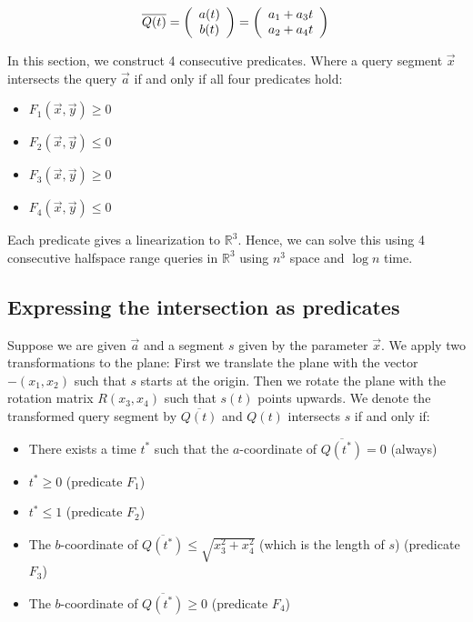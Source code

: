 \documentclass{article}
\begin{document}
\begin{equation}
        \overline{Q(t)} = \left( \begin{array}{c}
         a(t)  \\
         b(t) 
    \end{array}  \right) = \left( \begin{array}{c}
         a_1 +  a_3t  \\
         a_2 + a_4t 
    \end{array} \right)  \\
\end{equation}

In this section, we construct 4 consecutive predicates. Where a query segment $\vec{x}$ intersects the query $\vec{a}$ if and only if all four predicates hold:
\begin{itemize}
    \item $F_1(\vec{x}, \vec{y}) \ge 0$
    \item $F_2(\vec{x}, \vec{y}) \le 0$
    \item $F_3(\vec{x}, \vec{y}) \ge 0$
    \item $F_4(\vec{x}, \vec{y}) \le 0$
\end{itemize}

Each predicate gives a linearization to $\mathbb{R}^3$. Hence, we can solve this using 4 consecutive halfspace range queries in $\mathbb{R}^3$ using $n^3$ space and $\log n$ time.

\subsection{Expressing the intersection as predicates}

Suppose we are given $\vec{a}$ and a segment $s$ given by the parameter $\vec{x}$. We apply two transformations to the plane: First we translate the plane with the vector $-(x_1, x_2)$ such that $s$ starts at the origin. Then we rotate the plane with the rotation matrix $R(x_3, x_4)$ such that $s(t)$ points upwards. We denote the transformed query segment by $\overline{Q(t)}$ and $Q(t)$ intersects $s$ if and only if:

\begin{itemize}
    \item There exists a time $t^*$ such that the $a$-coordinate of $\overline{Q(t^*)} = 0$ (always) 
    \item $t^* \ge 0$ (predicate $F_1$)
    \item $t^* \le 1$ (predicate $F_2$)
    \item The $b$-coordinate of $\overline{Q(t^*)} \le \sqrt{x_3^2 + x_4^2}$ (which is the length of $s$) (predicate $F_3$)
    \item The $b$-coordinate of $\overline{Q(t^*)} \ge 0$ (predicate $F_4$)

\end{itemize}
\end{document}
